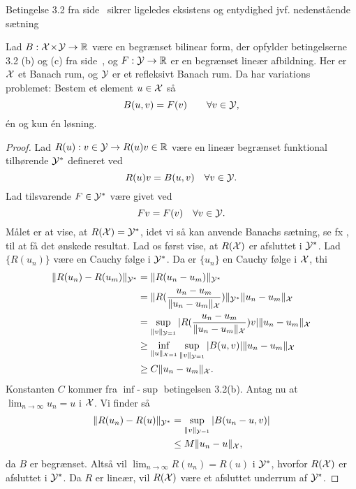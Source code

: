 Betingelse 3.2 fra side~\pageref{cond32} sikrer ligeledes eksistens og
entydighed jvf. nedenstående sætning
\begin{theorem} \label{refleksiv}
Lad $B:\mathcal{X}\!\times\!\mathcal{Y}\rightarrow\mathbb{R}$ være en begrænset bilinear form,
der opfylder betingelserne 3.2 (b) og (c) fra
side~\pageref{cond32}, og
$F:\mathcal{Y}\rightarrow\mathbb{R}$ er en begrænset lineær afbildning. Her er $\mathcal{X}$ et
Banach rum, og $\mathcal{Y}$ er et refleksivt Banach rum. Da har
variations problemet: Bestem et element $u\in\mathcal{X}$ så
\begin{equation} 
B(u,v)=F(v) \qquad \forall v\in\mathcal{Y},
\end{equation} 
\'{e}n og kun \'{e}n løsning.
\end{theorem}
\begin{proof}
Lad $R(u):v\in\mathcal{Y} \rightarrow R(u)v\in\mathbb{R}$ være en lineær begrænset
funktional tilhørende $\mathcal{Y}^{\ast}$ defineret ved
\begin{equation}
  R(u)v=B(u,v) \quad \forall v\in\mathcal{Y}.
\end{equation}
Lad tilsvarende $F\in\mathcal{Y}^{\ast}$ være givet ved
\begin{equation}
  Fv=F(v) \quad \forall v\in\mathcal{Y}.
\end{equation}
Målet er at vise, at $R(\mathcal{X})=\mathcal{Y}^{\ast}$, idet vi så kan anvende
Banachs sætning, se fx \cite[s. 34]{berger}, til at få det ønskede
resultat. Lad os først vise, at $R(\mathcal{X})$ er afsluttet i $\mathcal{Y}^{\ast}$. Lad
$\{R(u_n)\}$ være en Cauchy følge i $\mathcal{Y}^{\ast}$. Da er $\{u_n\}$ en
Cauchy følge i $\mathcal{X}$, thi
\begin{equation}
\begin{split}
  \|R(u_n)-R(u_m)\|_{\mathcal{Y}^{\ast}} &= \|R(u_n-u_m)\|_{\mathcal{Y}^{\ast}} \\
  &= \|R(\frac{u_n-u_m}{\|u_n-u_m\|_{\mathcal{X}}})\|_{\mathcal{Y}^{\ast}}\|u_n-u_m\|_{\mathcal{X}} \\
  &= \sup_{\|v\|_{\mathcal{Y}=1}}|R(\frac{u_n-u_m}{\|u_n-u_m\|_{\mathcal{X}}})v|\|u_n-u_m\|_{\mathcal{X}} \\
  &\geq \inf_{\|u\|_{\mathcal{X}=1}}\sup_{\|v\|_{\mathcal{Y}=1}} |B(u,v)|\|u_n-u_m\|_{\mathcal{X}} \\
  &\geq C\|u_n-u_m\|_{\mathcal{X}} . \\
\end{split}
\end{equation}
Konstanten $C$ kommer fra $\inf$-$\sup$ betingelsen 3.2(b). Antag nu at
$\lim_{n\rightarrow\infty} u_n = u$ i $\mathcal{X}$. Vi finder så
\begin{equation}
\begin{split}
  \|R(u_n)-R(u)\|_{\mathcal{Y}^{\ast}} &= \sup_{\|v\|_{\mathcal{Y}=1}} |B(u_n-u,v)| \\
  &\leq M\|u_n-u\|_{\mathcal{X}} , \\
\end{split}
\end{equation}  
da $B$ er begrænset. Altså vil $\lim_{n\rightarrow\infty} R(u_n) =
R(u)$ i $\mathcal{Y}^{\ast}$, hvorfor $R(\mathcal{X})$ er afsluttet i $\mathcal{Y}^{\ast}$. Da
$R$ er lineær, vil $R(\mathcal{X})$ være et afsluttet underrum af $\mathcal{Y}^{\ast}$.


\end{proof}
